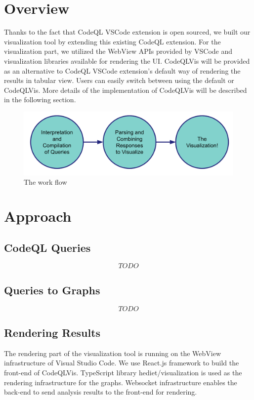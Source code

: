 \documentclass[sigplan,10pt,review]{acmart}
\begin{document}
\section{Overview}
Thanks to the fact that CodeQL VSCode extension is open sourced, we built our visualization tool by extending this existing CodeQL extension. For the visualization part, we utilized the WebView APIs provided by VSCode and visualization libraries available for rendering the UI. 
\newline
\indent CodeQLVis will be provided as an alternative to CodeQL VSCode extension's default way of rendering the results in tabular view. Users can easily switch between using the default or CodeQLVis. More details of the implementation of CodeQLVis will be described in the following section.

\begin{figure}[h]
  \centering
  \includegraphics[width=\linewidth]{work_flow}
  \caption{The work flow}
\end{figure}

\section{Approach}
\subsection{CodeQL Queries}
\[TODO\] 
\subsection{Queries to Graphs}
\[TODO\] 
\subsection{Rendering Results}
The rendering part of the visualization tool is running on the WebView infrastructure of Visual Studio Code. We use React.js framework to build the front-end of CodeQLVis. TypeScript library hediet/visualization is used as the rendering infrastructure for the graphs. Websocket infrastructure enables the back-end to send analysis results to the front-end for rendering. 
\end{document}
